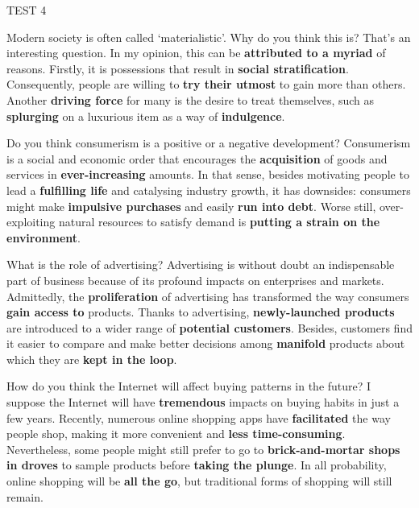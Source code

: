 \begin{glossarymc}[Cambridge 3]
\begin{test}{TEST 4}
\begin{qa}{Modern society is often called ‘materialistic’. Why do you think this is?}
That’s an interesting question. In my opinion, this can be \textbf{attributed to a myriad} of reasons. Firstly, it is possessions that result in \textbf{social stratification}. Consequently, people are willing to \textbf{try their utmost} to gain more than others. Another \textbf{driving force} for many is the desire to treat themselves, such as \textbf{splurging} on a luxurious item as a way of \textbf{indulgence}.
\end{qa}

\begin{qa}{Do you think consumerism is a positive or a negative development?}
Consumerism is a social and economic order that encourages the \textbf{acquisition} of goods and services in \textbf{ever-increasing} amounts. In that sense, besides motivating people to lead a \textbf{fulfilling life} and catalysing industry growth, it has downsides: consumers might make \textbf{impulsive purchases} and easily \textbf{run into debt}. Worse still, over-exploiting natural resources to satisfy demand is \textbf{putting a strain on the environment}.
\end{qa}

\begin{qa}{What is the role of advertising?}
Advertising is without doubt an indispensable part of business because of its profound impacts on enterprises and markets. Admittedly, the \textbf{proliferation} of advertising has transformed the way consumers \textbf{gain access to} products. Thanks to advertising, \textbf{newly-launched products} are introduced to a wider range of \textbf{potential customers}. Besides, customers find it easier to compare and make better decisions among \textbf{manifold} products about which they are \textbf{kept in the loop}.
\end{qa}

\begin{qa}{How do you think the Internet will affect buying patterns in the future?}
I suppose the Internet will have \textbf{tremendous} impacts on buying habits in just a few years. Recently, numerous online shopping apps have \textbf{facilitated} the way people shop, making it more convenient and \textbf{less time-consuming}. Nevertheless, some people might still prefer to go to \textbf{brick-and-mortar shops} \textbf{in droves} to sample products before \textbf{taking the plunge}. In all probability, online shopping will be \textbf{all the go}, but traditional forms of shopping will still remain.
\end{qa}


\end{test}
\end{glossarymc}
